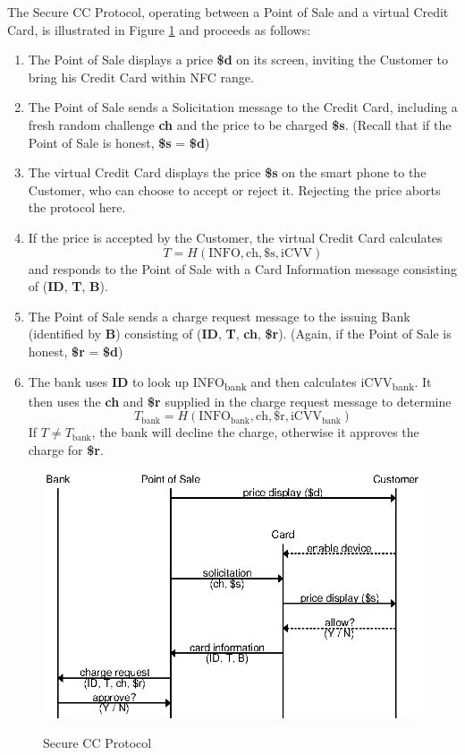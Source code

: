 The Secure CC Protocol, operating between a Point of Sale and a virtual Credit Card, is illustrated in Figure \ref{fig:secure-ccp} and proceeds as follows:

\begin{enumerate}
\item The Point of Sale displays a price \textbf{\$d} on its screen, inviting the Customer to bring his Credit Card within NFC range.
\item The Point of Sale sends a Solicitation message to the Credit Card, including a fresh random challenge \textbf{ch} and the price to be charged \textbf{\$s}.
	(Recall that if the Point of Sale is honest, \textbf{\$s} = \textbf{\$d})
\item The virtual Credit Card displays the price \textbf{\$s} on the smart phone to the Customer, who can choose to accept or reject it.
	Rejecting the price aborts the protocol here.
\item If the price is accepted by the Customer, the virtual Credit Card calculates
	$$T = H(\text{INFO}, \text{ch}, \text{\$s}, \text{iCVV})$$
	and responds to the Point of Sale with a Card Information message consisting of (\textbf{ID}, \textbf{T}, \textbf{B}).
\item The Point of Sale sends a charge request message to the issuing Bank (identified by \textbf{B}) consisting of (\textbf{ID}, \textbf{T}, \textbf{ch}, \textbf{\$r}).
	(Again, if the Point of Sale is honest, \textbf{\$r} = \textbf{\$d})
\item The bank uses \textbf{ID} to look up INFO\textsubscript{bank} and then calculates iCVV\textsubscript{bank}.
	It then uses the \textbf{ch} and \textbf{\$r} supplied in the charge request message to determine
	$$T_{\text{bank}} = H(\text{INFO}_{\text{bank}}, \text{ch}, \text{\$r}, \text{iCVV}_{\text{bank}})$$
	If $T \neq T_{\text{bank}}$, the bank will decline the charge, otherwise it approves the charge for \textbf{\$r}.
\end{enumerate}

\begin{figure}
  \caption{Secure CC Protocol}
  \centering
    \includegraphics{img/secure_ccp.eps}
  \label{fig:secure-ccp}
\end{figure}

